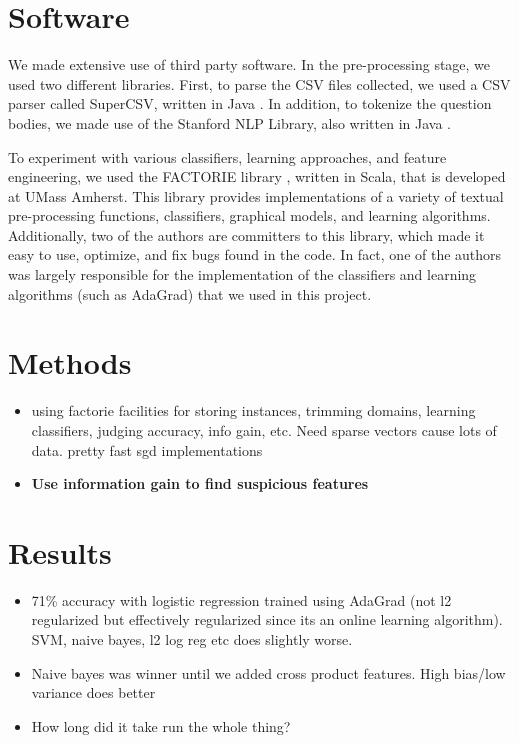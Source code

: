 \documentclass[11pt]{article}
\begin{document}
\section{Software}

We made extensive use of third party software. In the pre-processing stage, we
used two different libraries.  First, to parse the CSV files
collected, we used a CSV parser called SuperCSV, written in Java
\cite{website:supercsv}. In addition, to tokenize the question bodies,
we made use of the Stanford NLP Library, also written in Java
\cite{stanfordnlp}.

To experiment with various classifiers, learning approaches, and feature engineering, we used the
FACTORIE library \cite{mccallum09:factorie:}, written in Scala, that is developed at UMass Amherst.  This library provides implementations of a variety of textual pre-processing functions, classifiers, graphical models, and learning algorithms. Additionally, two of the authors are committers to this library, which made it easy to use, optimize, and fix bugs found in the code. In fact, one of the authors was largely responsible for the implementation of the classifiers and learning algorithms (such as AdaGrad) that we used in this project.

\section{Methods}
\begin{itemize}
\item using factorie facilities for storing instances, trimming domains, learning classifiers, judging accuracy, info gain, etc. Need sparse vectors cause lots of data. pretty fast sgd implementations
\item \textbf{Use information gain to find suspicious features}
\end{itemize}

\section{Results}
\begin{itemize}
\item 71\% accuracy with logistic regression trained using AdaGrad (not l2 regularized but effectively regularized since its an online learning algorithm). SVM, naive bayes, l2 log reg etc does slightly worse.
\item Naive bayes was winner until we added cross product
  features. High bias/low variance does better
  \item How long did it take run the whole thing?
\end{itemize}
\end{document}
